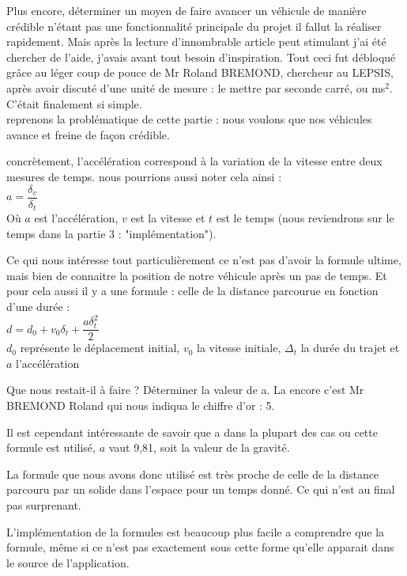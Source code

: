 \documentclass[a4paper,11pt]{article}
\begin{document}
Plus encore, déterminer un moyen de faire avancer un véhicule de manière crédible n'étant pas une fonctionnalité principale du projet il fallut la réaliser rapidement. Mais après la lecture d'innombrable article peut stimulant j'ai été chercher de l'aide, j'avais avant tout besoin d'inspiration. Tout ceci fut débloqué grâce au léger coup de pouce de Mr Roland BREMOND, chercheur au LEPSIS, après avoir discuté d'une unité de mesure : le mettre par seconde carré, ou ms$^2$. C'était finalement si simple.\\

reprenons la problématique de cette partie : nous voulons que nos véhicules avance et freine de façon crédible. 

concrètement, l'accélération correspond à la variation de la vitesse entre deux mesures de temps. nous pourrions aussi noter cela ainsi : \\

$ a = \dfrac{\delta_v}{\delta_t} $\\

Où $ a $ est l'accélération, $ v $ est la vitesse et $ t $ est le temps (nous reviendrons sur le temps dans la partie 3 : "implémentation").

Ce qui nous intéresse tout particulièrement ce n'est pas d'avoir la formule ultime, mais bien de connaitre la position de notre véhicule après un pas de temps. Et pour cela aussi il y a une formule : celle de la distance parcourue en fonction d'une durée : \\ 

$ d = d_0 + v_0\delta_t + \dfrac{a\delta_t^2}{2} $\\

$ d_0 $ représente le déplacement initial, $ v_0 $ la vitesse initiale, $ \Delta_t$ la durée du trajet et $ a $ l'accélération

Que nous restait-il à faire ? Déterminer la valeur de a. La encore c'est Mr BREMOND Roland qui nous indiqua le chiffre d'or : 5.

Il est cependant intéressante de savoir que a dans la plupart des cas ou cette formule est utilisé, $ a $ vaut 9,81, soit la valeur de la gravité.

La formule que nous avons donc utilisé est très proche de celle de la distance parcouru par un solide dans l'espace pour un temps donné. Ce qui n'est au final pas surprenant.

L'implémentation de la formules est beaucoup plus facile a comprendre que la formule, même si ce n'est pas exactement sous cette forme qu'elle apparait dans le source de l'application. \\
\end{document}
